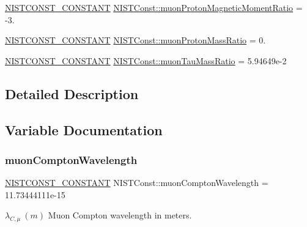 \begin{DoxyCompactItemize}
\item 
\mbox{\hyperlink{group___n_i_s_t_const-_macros_ga2b0fc1d7452373f816175dd86ce26729}{N\+I\+S\+T\+C\+O\+N\+S\+T\+\_\+\+C\+O\+N\+S\+T\+A\+NT}} \mbox{\hyperlink{group___n_i_s_t_const-_muon_ga535321fb921425b92d4f09870b6b500b}{N\+I\+S\+T\+Const\+::muon\+Proton\+Magnetic\+Moment\+Ratio}} = -\/3.
\item 
\mbox{\hyperlink{group___n_i_s_t_const-_macros_ga2b0fc1d7452373f816175dd86ce26729}{N\+I\+S\+T\+C\+O\+N\+S\+T\+\_\+\+C\+O\+N\+S\+T\+A\+NT}} \mbox{\hyperlink{group___n_i_s_t_const-_muon_gaaaab6090c4f02dd57bacde06a8113ae8}{N\+I\+S\+T\+Const\+::muon\+Proton\+Mass\+Ratio}} = 0.
\item 
\mbox{\hyperlink{group___n_i_s_t_const-_macros_ga2b0fc1d7452373f816175dd86ce26729}{N\+I\+S\+T\+C\+O\+N\+S\+T\+\_\+\+C\+O\+N\+S\+T\+A\+NT}} \mbox{\hyperlink{group___n_i_s_t_const-_muon_ga2429d4c7a129833cea3e1f94959c541c}{N\+I\+S\+T\+Const\+::muon\+Tau\+Mass\+Ratio}} = 5.\+94649e-\/2
\end{DoxyCompactItemize}


\subsection{Detailed Description}


\subsection{Variable Documentation}
\mbox{\label{group___n_i_s_t_const-_muon_gafa8e9fc422ec4dab36ec7fed34c4b1b0}} 
\subsubsection{\texorpdfstring{muon\+Compton\+Wavelength}{muonComptonWavelength}}
{\footnotesize\ttfamily \mbox{\hyperlink{group___n_i_s_t_const-_macros_ga2b0fc1d7452373f816175dd86ce26729}{N\+I\+S\+T\+C\+O\+N\+S\+T\+\_\+\+C\+O\+N\+S\+T\+A\+NT}} N\+I\+S\+T\+Const\+::muon\+Compton\+Wavelength = 11.\+73444111e-\/15}

$\lambda_{C,\mu} \ (m)$ Muon Compton wavelength in meters. \mbox{\label{group___n_i_s_t_const-_muon_ga7c9ea95beb94545d850a0ffa09c08630}} 
